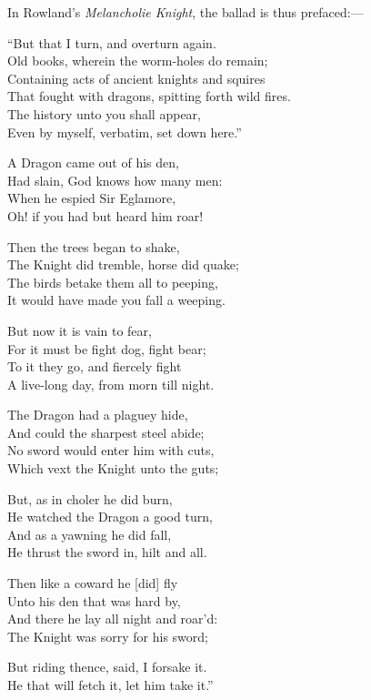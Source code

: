In Rowland’s \textit{Melancholie Knight}, the ballad is thus prefaced:—
\begin{scverse}
“But that I turn, and overturn again.\\
Old books, wherein the worm-holes do remain;\\
Containing acts of ancient knights and squires\\
That fought with dragons, spitting forth wild fires.\\
The history unto you shall appear,\\
Even by myself, verbatim, set down here.”
\end{scverse}



\pagebreak

\settowidth{\versewidth}{The Knight did tremble, horse did quake;}
\begin{dcverse}A Dragon came out of his den,\\
Had slain, God knows how many men:\\
When he espied Sir Eglamore,\\
Oh! if you had but heard him roar!

Then the trees began to shake,\\
The Knight did tremble, horse did quake;\\
The birds betake them all to peeping,\\
It would have made you fall a weeping.

But now it is vain to fear,\\
For it must be fight dog, fight bear;\\
To it they go, and fiercely fight\\
A live-long day, from morn till night.

The Dragon had a plaguey hide,\\
And could the sharpest steel abide;\\
No sword would enter him with cuts,\\
Which vext the Knight unto the guts;

But, as in choler he did burn,\\
He watched the Dragon a good turn,\\
And as a yawning he did fall,\\
He thrust the sword in, hilt and all.

Then like a coward he [did] fly\\
Unto his den that was hard by,\\
And there he lay all night and roar’d:\\
The Knight was sorry for his sword;
\end{dcverse}
\settowidth{\versewidth}{He that will fetch it, let him take it.”}
\begin{scverse}But riding thence, said, I forsake it.\\
He that will fetch it, let him take it.”
\end{scverse}

